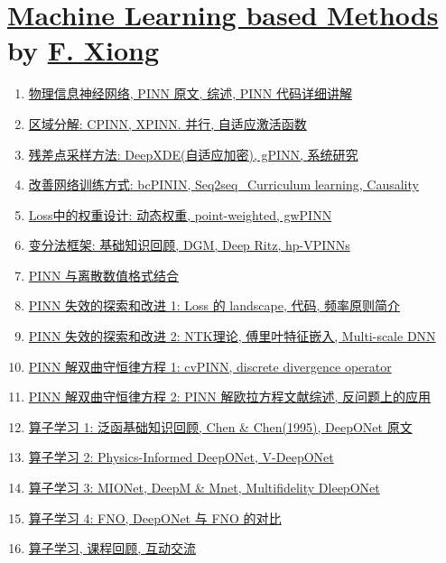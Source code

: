 \documentclass[11pt]{article}
\begin{document}
\newpage 

\section[Machine Learning based Methods]{{\large \href{https://www.bilibili.com/video/BV1nT411e7cC/?spm_id_from=333.1387.homepage.video_card.click&vd_source=d0661ef3fa56ddc850a3d1afc8c571e5}{Machine Learning based Methods}} by {\large \href{https://www.bimsa.cn/detail/fxiong.html}{F. Xiong}}}

\vspace{-0.5cm}

\begin{enumerate}
	\item \href{https://mp.weixin.qq.com/s/bUz1SwnVAWd7hXHuJkSehQ}{物理信息神经网络, PINN 原文, 综述, PINN 代码详细讲解}	%
	\item \href{https://mp.weixin.qq.com/s/HvSHWvno7AZ6iF0D5Dv02A}{区域分解: CPINN, XPINN. 并行, 自适应激活函数}	%
	\item \href{https://mp.weixin.qq.com/s/m6aEUkQ6zhx3DuUS5ciJNw}{残差点采样方法: DeepXDE(自适应加密), gPINN, 系统研究}	%
	\item \href{https://mp.weixin.qq.com/s/ByUhP-jyw4zgULcycfC6rQ}{改善网络训练方式: bcPININ, Seq2seq\_Curriculum learning, Causality}	%
	\item \href{https://mp.weixin.qq.com/s/mPpJz7k0ph6YEaZHj37UIA}{Loss中的权重设计: 动态权重, point-weighted, gwPINN}	%
	\item \href{https://mp.weixin.qq.com/s/k24dhUPOV9MBOCo2XYlRzg}{变分法框架: 基础知识回顾, DGM, Deep Ritz, hp-VPINNs}	%
	\item \href{https://mp.weixin.qq.com/s/dCGnzz_v7Y4lisPB0-_jHA}{PINN 与离散数值格式结合}	%
	\item \href{https://mp.weixin.qq.com/s/rrF0KjFAe53rHg2O65lyZQ}{PINN 失效的探索和改进 1: Loss 的 landscape, 代码, 频率原则简介}	%
	\item \href{https://mp.weixin.qq.com/s/D-DSUyBqHD0MfCduaqmF_A}{PINN 失效的探索和改进 2: NTK理论, 傅里叶特征嵌入, Multi-scale DNN}	%
	\item \href{https://mp.weixin.qq.com/s/5UHaDEPEwW5z1s7mHMDrFw}{PINN 解双曲守恒律方程 1: cvPINN, discrete divergence operator}	%
	\item \href{URL}{PINN 解双曲守恒律方程 2: PINN 解欧拉方程文献综述, 反问题上的应用}	%
	\item \href{https://mp.weixin.qq.com/s/rxP3E0sBmDyUVWgigzTzxw}{算子学习 1: 泛函基础知识回顾, Chen \& Chen(1995), DeepONet 原文}	%
	\item \href{https://mp.weixin.qq.com/s/CE5BaMBmoBoTFOB5XD22XA}{算子学习 2: Physics-Informed DeepONet, V-DeepONet}	%
	\item \href{https://mp.weixin.qq.com/s/8gvPWBGnO5q8Q0nJNNfiiQ}{算子学习 3: MIONet, DeepM \& Mnet, Multifidelity DleepONet}	%
	\item \href{URL}{算子学习 4: FNO, DeepONet 与 FNO 的对比}	%
	\item \href{https://mp.weixin.qq.com/s/yVZgv8RmqPHUXLepu93NAA}{算子学习, 课程回顾, 互动交流}	%
\end{enumerate}
\end{document}
